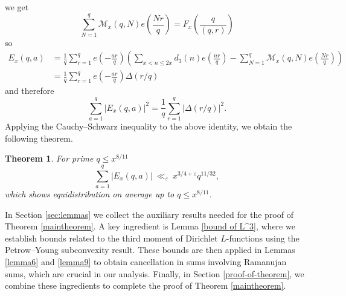 \documentclass[oneside,reqno,10pt]{amsart}
\numberwithin{equation}{section}
\theoremstyle{plain}
\newtheorem{theorem}{Theorem}[section]
\theoremstyle{definition}
\numberwithin{equation}{section}
\begin{document}
 we get
\begin{equation*}
\sum_{N=1}^{q}\mathcal{M}_{x}(q,N)e\left(\frac{Nr}{q}\right)=F_{x}\left(\frac{q}{(q,r)}\right)
\end{equation*}
 so
\begin{align*}
E_{x}(q,a)&=\frac{1}{q}\sum_{r=1}^{q}e\left(-\frac{ar}{q}\right)\left(\sum_{x<n\leq 2x}d_{3}(n)e\left(\frac{nr}{q}\right)-\sum_{N=1}^{q}\mathcal{M}_{x}(q,N)e\left(\frac{Nr}{q}\right)\right)\\
&=\frac{1}{q}\sum_{r=1}^{q}e\left(-\frac{ar}{q}\right)\Delta(r/q)
\end{align*}
 and therefore
\begin{equation}\label{equidistrubution}
    \sum_{a=1}^{q}|E_{x}(q,a)|^{2} = \frac{1}{q}\sum_{r=1}^{q}|\Delta(r/q)|^{2}.
\end{equation}
Applying the Cauchy–Schwarz inequality to the above identity, we obtain the following theorem.
\begin{theorem}
    For prime $q\leq x^{8/11}$
    \begin{equation}
        \sum_{a=1}^{q}|E_{x}(q,a)|\ \ll_{\varepsilon}\ x^{3/4+\varepsilon} q^{11/32} ,
    \end{equation}
    which shows equidistribution on average up to $q\leq x^{8/11}$. 
\end{theorem}
In Section \ref{sec:lemmas} we collect the auxiliary results needed for the proof of Theorem \ref{maintheorem}. A key ingredient is Lemma \ref{bound of L^3}, where we establish bounds related to the third moment of Dirichlet $L$-functions using the Petrow–Young \cite{PY} subconvexity result. These bounds are then applied in Lemmas \ref{lemma6} and \ref{lemma9} to obtain cancellation in sums involving Ramanujan sums, which are crucial in our analysis. Finally, in Section \ref{proof-of-theorem}, we combine these ingredients to complete the proof of Theorem \ref{maintheorem}.
\end{document}
